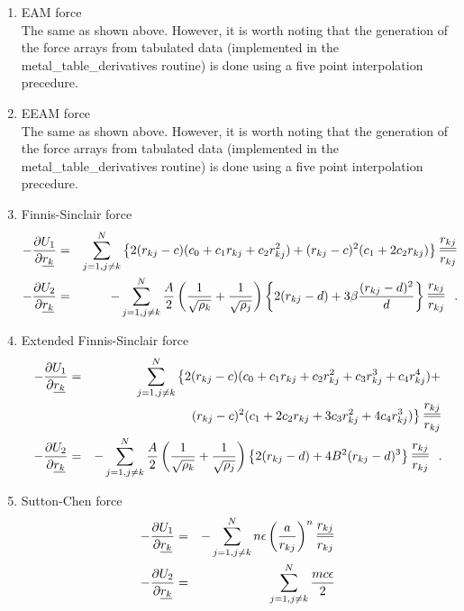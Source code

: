 \begin{enumerate}
\item EAM force \\
The same as shown above.  However, it is worth noting that the
generation of the force arrays from tabulated data (implemented
in the {\sc metal\_table\_derivatives} routine) is done using a
five point interpolation precedure.
\item EEAM force \\
The same as shown above.  However, it is worth noting that the
generation of the force arrays from tabulated data (implemented
in the {\sc metal\_table\_derivatives} routine) is done using a
five point interpolation precedure.
\item Finnis-Sinclair force
\begin{eqnarray}
-\frac{\partial U_{1}}{\partial \mbox{$\underline{r_{k}}$}} &=& \sum_{j=1,j \ne k}^{N} \left\{
2 (r_{kj}-c) (c_{0}+c_{1}r_{kj}+c_{2}r_{kj}^{2}) +
(r_{kj}-c)^{2} (c_{1}+2c_{2}r_{kj}) \right\} \frac{\mbox{$\underline{r_{kj}}$}}{r_{kj}} \nonumber \\
-\frac{\partial U_{2}}{\partial \mbox{$\underline{r_{k}}$}} &=& -\sum_{j=1,j \ne k}^{N}
{A \over 2} \left( {1 \over \sqrt{\rho_{k}}} + {1 \over \sqrt{\rho_{j}}} \right)
\left\{ 2(r_{kj}-d) + 3 \beta \frac{(r_{kj}-d)^{2}}{d} \right\} \frac{\mbox{$\underline{r_{kj}}$}}{r_{kj}}~~.
\end{eqnarray}
\item Extended Finnis-Sinclair force
\begin{eqnarray}
-\frac{\partial U_{1}}{\partial \mbox{$\underline{r_{k}}$}} &=& \sum_{j=1,j \ne k}^{N} \left\{
2 (r_{kj}-c) (c_{0}+c_{1}r_{kj}+c_{2}r_{kj}^{2}+c_{3}r_{kj}^{3}+c_{4}r_{kj}^{4}) + \right. \nonumber \\
& & \phantom{xxxxxxx} \left. (r_{kj}-c)^{2} (c_{1}+2c_{2}r_{kj}+3c_{3}r_{kj}^{2}+4c_{4}r_{kj}^{3}) \right\}
\frac{\mbox{$\underline{r_{kj}}$}}{r_{kj}} \\
-\frac{\partial U_{2}}{\partial \mbox{$\underline{r_{k}}$}} &=& -\sum_{j=1,j \ne k}^{N}
{A \over 2} \left( {1 \over \sqrt{\rho_{k}}} + {1 \over \sqrt{\rho_{j}}} \right)
\left\{ 2(r_{kj}-d) + 4 B^{2} (r_{kj}-d)^{3}\right\} \frac{\mbox{$\underline{r_{kj}}$}}{r_{kj}}~~. \nonumber
\end{eqnarray}
\item Sutton-Chen force
\begin{eqnarray}
-\frac{\partial U_{1}}{\partial \vek{r_{k}}} &=& -\sum_{j=1,j \ne k}^{N} n \epsilon
\left( \frac{a}{r_{kj}} \right)^{n} \frac{\vek{r_{kj}}}{r_{kj}} \nonumber \\
-\frac{\partial U_{2}}{\partial \vek{r_{k}}} &=& \sum_{j=1,j \ne k}^{N} \frac{m c \epsilon}{2}

\end{eqnarray}
\end{enumerate}
